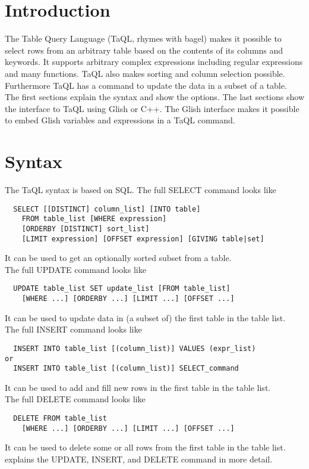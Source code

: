 

\section{Introduction}
The Table Query Language (TaQL, rhymes with bagel) makes
it possible to select
rows from an arbitrary table based on the contents of its
columns and keywords. It supports arbitrary complex
expressions including regular expressions and many functions.
TaQL also makes sorting and column selection possible.
Furthermore TaQL has a command to update the data in a subset of a table.
\\
The first sections explain the syntax and show the options.
The last sections show the interface to TaQL using Glish or C++.
The Glish interface makes it possible to embed Glish
variables and expressions in a TaQL command.

\section{Syntax}
The TaQL syntax is based on SQL. The full SELECT command looks like
\begin{verbatim}
  SELECT [[DISTINCT] column_list] [INTO table]
    FROM table_list [WHERE expression]
    [ORDERBY [DISTINCT] sort_list]
    [LIMIT expression] [OFFSET expression] [GIVING table|set]
\end{verbatim}
It can be used to get an optionally sorted subset from a table.
\\The full UPDATE command looks like
\begin{verbatim}
  UPDATE table_list SET update_list [FROM table_list]
    [WHERE ...] [ORDERBY ...] [LIMIT ...] [OFFSET ...]
\end{verbatim}
It can be used to update data in (a subset of) the first table in the
table list. 
\\The full INSERT command looks like
\begin{verbatim}
  INSERT INTO table_list [(column_list)] VALUES (expr_list)
or
  INSERT INTO table_list [(column_list)] SELECT_command
\end{verbatim}
It can be used to add and fill new rows in the first table in the
table list.
\\The full DELETE command looks like
\begin{verbatim}
  DELETE FROM table_list
    [WHERE ...] [ORDERBY ...] [LIMIT ...] [OFFSET ...]
\end{verbatim}
It can be used to delete some or all rows from the first table
in the table list.
\\ explains the
UPDATE, INSERT, and DELETE command in more detail.

